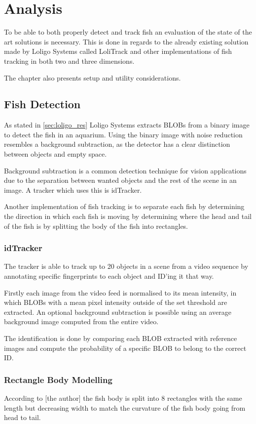 \graphicspath{{figures/analysis/}}
\chapter{Analysis}\label{ch:analysis}
To be able to both properly detect and track fish an evaluation of the state of the art solutions is necessary. This is done in regards to the already existing solution made by Loligo Systems called LoliTrack and other implementations of fish tracking in both two and three dimensions.

The chapter also presents setup and utility considerations.

\section{Fish Detection}
As stated in \autoref{sec:loligo_res} Loligo Systems extracts BLOBs from a binary image to detect the fish in an aquarium. Using the binary image with noise reduction resembles a background subtraction, as the detector has a clear distinction between objects and empty space.

Background subtraction is a common detection technique for vision applications due to the separation between wanted objects and the rest of the scene in an image. A tracker which uses this is idTracker.

Another implementation of fish tracking is to separate each fish by determining the direction in which each fish is moving by determining where the head and tail of the fish is by splitting the body of the fish into rectangles.

\subsection{idTracker}
The tracker is able to track up to 20 objects in a scene from a video sequence by annotating specific fingerprints to each object and ID'ing it that way.

Firstly each image from the video feed is normalised to its mean intensity, in which BLOBs with a mean pixel intensity outside of the set threshold are extracted. An optional background subtraction is possible using an average background image computed from the entire video.

The identification is done by comparing each BLOB extracted with reference images and compute the probability of a specific BLOB to belong to the correct ID.

\subsection{Rectangle Body Modelling}
According to [the author] the fish body is split into 8 rectangles with the same length but decreasing width to match the curvature of the fish body going from head to tail.

